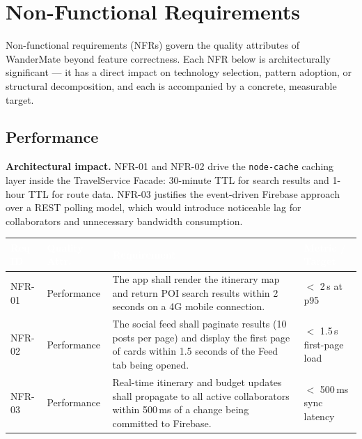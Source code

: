 \documentclass[12pt, a4paper]{article}
\newcommand{\reqid}[1]{\textsc{\small #1}}
\newcommand{\thcell}[1]{\textcolor{white}{\textbf{\small #1}}}
\begin{document}
\section{Non-Functional Requirements}

Non-functional requirements (NFRs) govern the quality attributes of WanderMate beyond feature correctness. Each NFR below is architecturally significant --- it has a direct impact on technology selection, pattern adoption, or structural decomposition, and each is accompanied by a concrete, measurable target.

\subsection{Performance}

\begin{tcolorbox}[notebox]
  \textbf{Architectural impact.} NFR-01 and NFR-02 drive the \texttt{node-cache} caching layer inside the TravelService Facade: 30-minute TTL for search results and 1-hour TTL for route data. NFR-03 justifies the event-driven Firebase approach over a REST polling model, which would introduce noticeable lag for collaborators and unnecessary bandwidth consumption.
\end{tcolorbox}

\vspace{0.4em}
\begin{longtable}{C{1.5cm} C{2.4cm} L{7.0cm} C{2.7cm}}
\toprule
{}
\thcell{Req ID} & \thcell{Quality Attr.} & \thcell{Requirement} & \thcell{Metric / Target} \\
\midrule
\endhead
\bottomrule
\endfoot

\reqid{NFR-01} & Performance &
The app shall render the itinerary map and return POI search results within 2 seconds on a 4G mobile connection. &
$<$ 2\,s at p95 \\

\reqid{NFR-02} & Performance &
The social feed shall paginate results (10 posts per page) and display the first page of cards within 1.5 seconds of the Feed tab being opened. &
$<$ 1.5\,s first-page load \\

\reqid{NFR-03} & Performance &
Real-time itinerary and budget updates shall propagate to all active collaborators within 500\,ms of a change being committed to Firebase. &
$<$ 500\,ms sync latency \\

\end{longtable}
\end{document}
